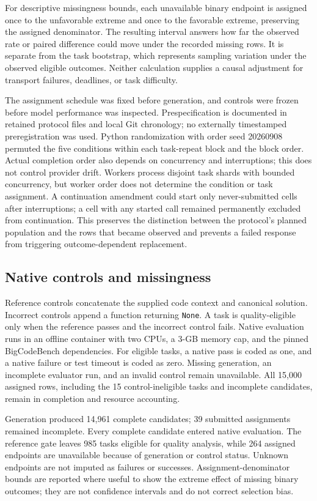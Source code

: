 \documentclass[pdflatex,sn-nature]{scientificreports}
\begin{document}
For descriptive missingness bounds, each unavailable binary endpoint is assigned once to the unfavorable extreme and once to the favorable extreme, preserving the assigned denominator. The resulting interval answers how far the observed rate or paired difference could move under the recorded missing rows. It is separate from the task bootstrap, which represents sampling variation under the observed eligible outcomes. Neither calculation supplies a causal adjustment for transport failures, deadlines, or task difficulty.

The assignment schedule was fixed before generation, and controls were frozen before model performance was inspected. Prespecification is documented in retained protocol files and local Git chronology; no externally timestamped preregistration was used. Python randomization with order seed 20260908 permuted the five conditions within each task-repeat block and the block order. Actual completion order also depends on concurrency and interruptions; this does not control provider drift. Workers process disjoint task shards with bounded concurrency, but worker order does not determine the condition or task assignment. A continuation amendment could start only never-submitted cells after interruptions; a cell with any started call remained permanently excluded from continuation. This preserves the distinction between the protocol's planned population and the rows that became observed and prevents a failed response from triggering outcome-dependent replacement.

\subsection{Native controls and missingness}
Reference controls concatenate the supplied code context and canonical solution. Incorrect controls append a function returning \texttt{None}. A task is quality-eligible only when the reference passes and the incorrect control fails. Native evaluation runs in an offline container with two CPUs, a 3-GB memory cap, and the pinned BigCodeBench dependencies. For eligible tasks, a native pass is coded as one, and a native failure or test timeout is coded as zero. Missing generation, an incomplete evaluator run, and an invalid control remain unavailable. All 15,000 assigned rows, including the 15 control-ineligible tasks and incomplete candidates, remain in completion and resource accounting.

Generation produced 14,961 complete candidates; 39 submitted assignments remained incomplete. Every complete candidate entered native evaluation. The reference gate leaves 985 tasks eligible for quality analysis, while 264 assigned endpoints are unavailable because of generation or control status. Unknown endpoints are not imputed as failures or successes. Assignment-denominator bounds are reported where useful to show the extreme effect of missing binary outcomes; they are not confidence intervals and do not correct selection bias.
\end{document}
